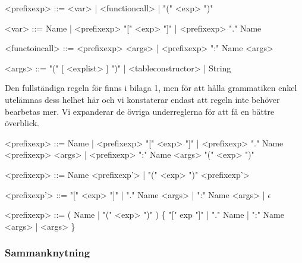\begin{description}
  \setlength{\grammarindent}{8em}
  \item[Ursprungsregel] \hfill
    \begin{grammar}
      \singlespace\small%
      \selectfont
      <prefixexp> ::= <var> | <functioncall> | "(" <exp> ")"

      <var> ::= Name | <prefixexp> "[" <exp> "]" | <prefixexp> "." Name

      <functoincall> ::= <prefixexp> <args> | <prefixexp> ":" Name <args>

      <args> ::= "(" [ <explist> ] ")" | <tableconstructor> | String
    \end{grammar}

    Den fullständiga regeln för  finns i bilaga 1, men för
    att hålla grammatiken enkel utelämnas dess helhet här och vi konstaterar
    endast att regeln inte behöver bearbetas mer. Vi expanderar de övriga
    underreglerna för att få en bättre överblick.


    \begin{grammar}
      \singlespace\small%
      \selectfont
      <prefixexp> ::= Name | <prefixexp> "[" <exp> "]" | <prefixexp> "." Name
        \alt <prefixexp> <args> | <prefixexp> ":" Name <args>
        \alt "(" <exp> ")"
    \end{grammar}

  \item[Eliminering av vänsterrekursion] \hfill
    \begin{grammar}
      \singlespace\small%
      \selectfont
      <prefixexp> ::= Name <prefixexp'> | "(" <exp> ")" <prefixexp'>

      <prefixexp'> ::= "[" <exp> "]" | "." Name <args> | ":" Name <args> |
      $\epsilon$
    \end{grammar}

  \item[Resultat] \hfill
    \begin{grammar}
      \singlespace\small%
      \selectfont
      <prefixexp> ::= ( Name | "(" <exp> ")" ) \{ "[" exp "]" | "." Name |
          ":" Name <args> | <args> \}
    \end{grammar}
\end{description}

\subsubsection{Sammanknytning}

